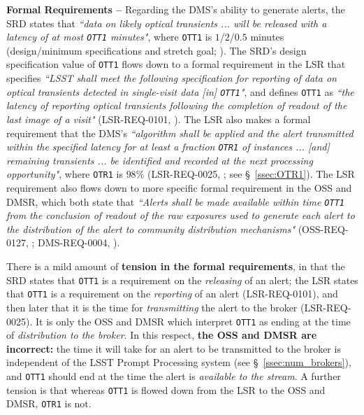 \documentclass[DM,authoryear,toc]{lsstdoc}
\begin{document}
{\bf Formal Requirements --} Regarding the DMS's ability to generate alerts, the SRD states that {\it ``data on likely optical transients ... will be released with a latency of at most {\tt OTT1} minutes"}, where {\tt OTT1} is $1$/$2$/$0.5$ minutes (design/minimum specifications and stretch goal; ). The SRD's design specification value of {\tt OTT1} flows down to a formal requirement in the LSR that specifies {\it ``LSST shall meet the following specification for reporting of data on optical transients detected in single-visit data [in] {\tt OTT1}"}, and defines {\tt OTT1} as {\it ``the latency of reporting optical transients following the completion of readout of the last image of a visit"} (LSR-REQ-0101, ). The LSR also makes a formal requirement that the DMS's {\it ``algorithm shall be applied and the alert transmitted within the specified latency for at least a fraction {\tt OTR1} of instances ... [and] remaining transients ... be identified and recorded at the next processing opportunity"}, where {\tt OTR1} is $98\%$ (LSR-REQ-0025, ; see \S~\ref{ssec:OTR1}). The LSR requirement also flows down to more specific formal requirement in the OSS and DMSR, which both state that {\it ``Alerts shall be made available within time {\tt OTT1} from the conclusion of readout of the raw exposures used to generate each alert to the distribution of the alert to community distribution mechanisms"} (OSS-REQ-0127, ; DMS-REQ-0004, ).

There is a mild amount of {\bf tension in the formal requirements}, in that the SRD states that {\tt OTT1} is a requirement on the {\it releasing} of an alert; the LSR states that {\tt OTT1} is a requirement on the {\it reporting} of an alert (LSR-REQ-0101), and then later that it is the time for {\it transmitting} the alert to the broker (LSR-REQ-0025). It is only the OSS and DMSR which interpret {\tt OTT1} as ending at the time of {\it distribution to the broker}. In this respect, {\bf the OSS and DMSR are incorrect:} the time it will take for an alert to be transmitted to the broker is independent of the LSST Prompt Processing system (see \S~\ref{ssec:num_brokers}), and {\tt OTT1} should end at the time the alert is {\it available to the stream}. A further tension is that whereas {\tt OTT1} is flowed down from the LSR to the OSS and DMSR, {\tt OTR1} is not.
\end{document}
